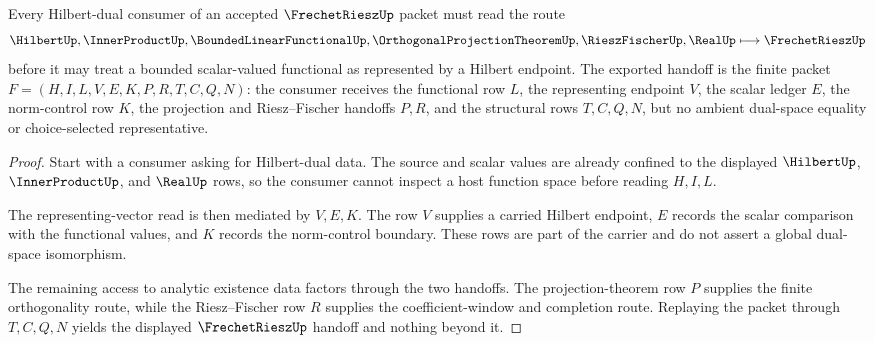 \begin{theorem}
\label{thm:frechet-riesz-hilbert-dual-handoff}
Every Hilbert-dual consumer of an accepted $\FrechetRieszUp$ packet must read the route
$$
\HilbertUp,\InnerProductUp,\BoundedLinearFunctionalUp,\OrthogonalProjectionTheoremUp,\RieszFischerUp,\RealUp
\longmapsto
\FrechetRieszUp
$$
before it may treat a bounded scalar-valued functional as represented by a Hilbert endpoint. The exported handoff is the finite packet $F=(H,I,L,V,E,K,P,R,T,C,Q,N)$: the consumer receives the functional row $L$, the representing endpoint $V$, the scalar ledger $E$, the norm-control row $K$, the projection and Riesz--Fischer handoffs $P,R$, and the structural rows $T,C,Q,N$, but no ambient dual-space equality or choice-selected representative.
\end{theorem}
\begin{proof}
Start with a consumer asking for Hilbert-dual data. The source and scalar values are already confined to the displayed $\HilbertUp$, $\InnerProductUp$, and $\RealUp$ rows, so the consumer cannot inspect a host function space before reading $H,I,L$.

The representing-vector read is then mediated by $V,E,K$. The row $V$ supplies a carried Hilbert endpoint, $E$ records the scalar comparison with the functional values, and $K$ records the norm-control boundary. These rows are part of the carrier and do not assert a global dual-space isomorphism.

The remaining access to analytic existence data factors through the two handoffs. The projection-theorem row $P$ supplies the finite orthogonality route, while the Riesz--Fischer row $R$ supplies the coefficient-window and completion route. Replaying the packet through $T,C,Q,N$ yields the displayed $\FrechetRieszUp$ handoff and nothing beyond it.
\end{proof}


